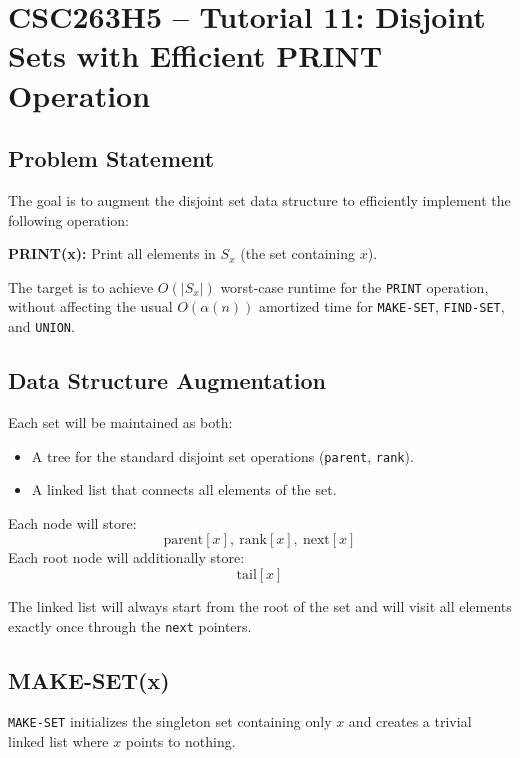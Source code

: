 \documentclass[12pt]{article}
\begin{document}
\renewcommand{\familydefault}{\rmdefault}



\section*{CSC263H5 – Tutorial 11: Disjoint Sets with Efficient PRINT Operation}

\subsection*{Problem Statement}

The goal is to augment the disjoint set data structure to efficiently implement the following operation:

\textbf{PRINT(x):} Print all elements in \( S_x \) (the set containing \( x \)).

The target is to achieve \( O(|S_x|) \) worst-case runtime for the \texttt{PRINT} operation, without affecting the usual \( O(\alpha(n)) \) amortized time for \texttt{MAKE-SET}, \texttt{FIND-SET}, and \texttt{UNION}.

\subsection*{Data Structure Augmentation}

Each set will be maintained as both:
\begin{itemize}
    \item A tree for the standard disjoint set operations (\texttt{parent}, \texttt{rank}).
    \item A linked list that connects all elements of the set.
\end{itemize}

Each node will store:
\[
\text{parent}[x],\ \text{rank}[x],\ \text{next}[x]
\]
Each root node will additionally store:
\[
\text{tail}[x]
\]

The linked list will always start from the root of the set and will visit all elements exactly once through the \texttt{next} pointers.

\subsection*{MAKE-SET(x)}

\texttt{MAKE-SET} initializes the singleton set containing only \( x \) and creates a trivial linked list where \( x \) points to nothing.
\end{document}

